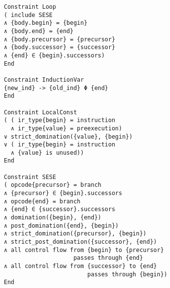 \begin{lstlisting}
Constraint Loop
( include SESE
∧ {body.begin} = {begin}
∧ {body.end} = {end}
∧ {body.precursor} = {precursor}
∧ {body.successor} = {successor}
∧ {end} ∈ {begin}.successors)
End

Constraint InductionVar
{new_ind} -> {old_ind} Φ {end}
End

Constraint LocalConst
( ( ir_type{begin} = instruction
  ∧ ir_type{value} = preexecution)
∨ strict_domination({value}, {begin})
∨ ( ir_type{begin} = instruction
  ∧ {value} is unused))
End

Constraint SESE
( opcode{precursor} = branch
∧ {precursor} ∈ {begin}.successors
∧ opcode{end} = branch
∧ {end} ∈ {successor}.successors
∧ domination({begin}, {end})
∧ post_domination({end}, {begin})
∧ strict_domination({precursor}, {begin})
∧ strict_post_domination({successor}, {end})
∧ all control flow from {begin} to {precursor}
                    passes through {end}
∧ all control flow from {successor} to {end}
                        passes through {begin})
End
\end{lstlisting}
